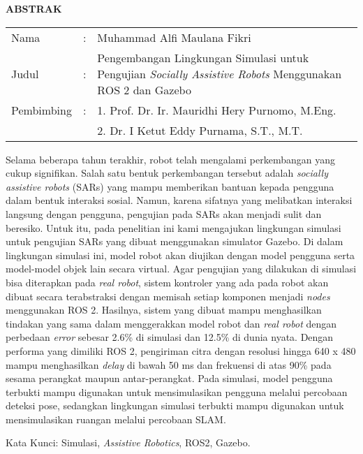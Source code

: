\begin{center}
  \large\textbf{ABSTRAK}
\end{center}

\vspace{2ex}

\begingroup
  \setlength{\tabcolsep}{0pt}
  \noindent
  \begin{tabularx}{\textwidth}{l >{\centering}m{2em} X}
    Nama        &:& Muhammad Alfi Maulana Fikri \\
    Judul       &:&	Pengembangan Lingkungan Simulasi untuk Pengujian \emph{Socially Assistive Robots} Menggunakan ROS 2 dan Gazebo \\
    Pembimbing  &:& 1. Prof. Dr. Ir. Mauridhi Hery Purnomo, M.Eng. \\
                & & 2. Dr. I Ketut Eddy Purnama, S.T., M.T. \\
  \end{tabularx}
\endgroup

Selama beberapa tahun terakhir,
  robot telah mengalami perkembangan yang cukup signifikan.
Salah satu bentuk perkembangan tersebut adalah \emph{socially assistive robots} (SARs) yang mampu memberikan bantuan kepada pengguna dalam bentuk interaksi sosial.
Namun, karena sifatnya yang melibatkan interaksi langsung dengan pengguna,
  pengujian pada SARs akan menjadi sulit dan beresiko.
Untuk itu, pada penelitian ini kami mengajukan lingkungan simulasi untuk pengujian SARs yang dibuat menggunakan simulator Gazebo.
Di dalam lingkungan simulasi ini,
  model robot akan diujikan dengan model pengguna serta model-model objek lain secara virtual.
Agar pengujian yang dilakukan di simulasi bisa diterapkan pada \emph{real robot},
  sistem kontroler yang ada pada robot akan dibuat secara terabstraksi dengan memisah setiap komponen menjadi \emph{nodes} menggunakan ROS 2.
Hasilnya,
  sistem yang dibuat mampu menghasilkan tindakan yang sama dalam menggerakkan model robot dan \emph{real robot} dengan perbedaan \emph{error} sebesar 2.6\% di simulasi dan 12.5\% di dunia nyata.
Dengan performa yang dimiliki ROS 2, pengiriman citra dengan resolusi hingga 640 x 480 mampu menghasilkan \emph{delay} di bawah 50 ms dan frekuensi di atas 90\% pada sesama perangkat maupun antar-perangkat.
Pada simulasi,
  model pengguna terbukti mampu digunakan untuk mensimulasikan pengguna melalui percobaan deteksi pose,
  sedangkan lingkungan simulasi terbukti mampu digunakan untuk mensimulasikan ruangan melalui percobaan SLAM.

Kata Kunci: Simulasi, \emph{Assistive Robotics}, ROS2, Gazebo.
